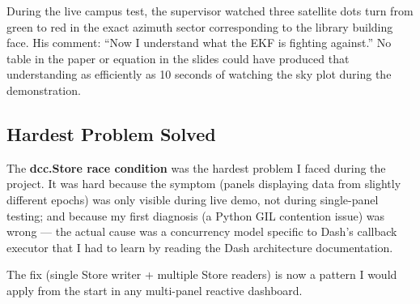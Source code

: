 \documentclass[12pt,a4paper]{article}
\begin{document}
During the live campus test, the supervisor watched three satellite dots turn from green
to red in the exact azimuth sector corresponding to the library building face.
His comment: ``Now I understand what the EKF is fighting against.''
No table in the paper or equation in the slides could have produced that understanding
as efficiently as 10 seconds of watching the sky plot during the demonstration.

\subsection{Hardest Problem Solved}

The \textbf{dcc.Store race condition} was the hardest problem I faced during the project.
It was hard because the symptom (panels displaying data from slightly different epochs)
was only visible during live demo, not during single-panel testing; and because my first
diagnosis (a Python GIL contention issue) was wrong --- the actual cause was a
concurrency model specific to Dash's callback executor that I had to learn by reading
the Dash architecture documentation.

The fix (single Store writer + multiple Store readers) is now a pattern I would apply
from the start in any multi-panel reactive dashboard.




\end{document}
